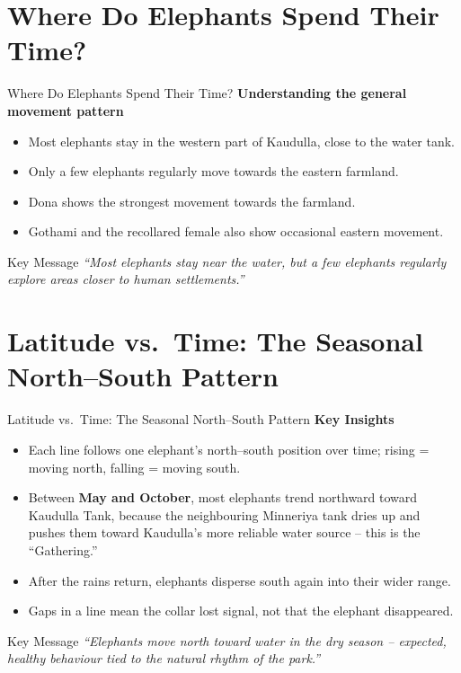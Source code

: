 \documentclass{beamer}
\begin{document}
	
	
	
	
	\section{Where Do Elephants Spend Their Time?}
	\begin{frame}{Where Do Elephants Spend Their Time?}
		\textbf{Understanding the general movement pattern}
		\begin{itemize}
			\item Most elephants stay in the western part of Kaudulla, close to the water tank.
			\item Only a few elephants regularly move towards the eastern farmland.
			\item Dona shows the strongest movement towards the farmland.
			\item Gothami and the recollared female also show occasional eastern movement.
		\end{itemize}
		
		\vspace{0.5cm}
		\begin{block}{Key Message}
			\textit{``Most elephants stay near the water, but a few elephants regularly explore areas closer to human settlements.''}
		\end{block}
	\end{frame}
	
	
	
	
	\section{Latitude vs.\ Time: The Seasonal North--South Pattern}
	\begin{frame}{Latitude vs.\ Time: The Seasonal North--South Pattern}
		\textbf{Key Insights}
		\footnotesize
		\begin{itemize}
			\item Each line follows one elephant's north--south position over time; rising = moving north, falling = moving south.
			\item Between \textbf{May and October}, most elephants trend northward toward Kaudulla Tank, because the neighbouring Minneriya tank dries up and pushes them toward Kaudulla's more reliable water source -- this is the ``Gathering.''
			\item After the rains return, elephants disperse south again into their wider range.
			\item Gaps in a line mean the collar lost signal, not that the elephant disappeared.
		\end{itemize}
		
		\vspace{0.4cm}
		\begin{block}{Key Message}
			\textit{``Elephants move north toward water in the dry season -- expected, healthy behaviour tied to the natural rhythm of the park.''}
		\end{block}
	\end{frame}
	
\end{document}
